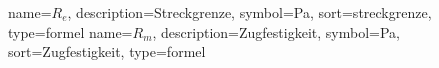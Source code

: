 {%
    name={$R_e$},
    description={Streckgrenze},
    symbol={Pa},
    sort=streckgrenze,
    type=formel
}
{%
    name={$R_m$},
    description={Zugfestigkeit},
    symbol={Pa},
    sort=Zugfestigkeit,
    type=formel
}